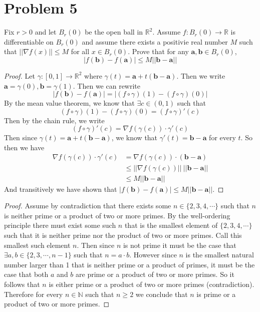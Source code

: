 \documentclass{article}
\theoremstyle{definition}
\begin{document}
\section*{Problem 5}
    \begin{mdframed}
        Fix $r > 0$ and let $B_r(0)$ be the open ball in $\mathbb{R}^2$. Assume $f: B_r(0) \rightarrow \mathbb{R}
        $ is differentiable on $B_r(0)$ and assume there exists a positivie real number $M$ such that $||\nabla f(x)|| \leqslant M$
        for all $x \in B_r(0)$. Prove that for any $\bm a,\bm b \in B_r(0)$,
        \[
            |f(\bm b) - f(\bm a)| \leqslant M||\bm b-\bm a||
        \]
    \end{mdframed}
    \begin{proof}
        Let $\gamma : [0,1] \rightarrow \mathbb{R}^2$ where $\gamma(t) = \bm a + t (\bm b - \bm a)$.
        Then we write $\bm a = \gamma(0), \bm b = \gamma(1)$. Then we can rewrite 
        \[
            |f(\bm b) - f(\bm a)| = |(f\circ \gamma)(1) - (f \circ \gamma)(0)|
        \]
        By the mean value theorem, we know that $\exists c \in (0,1)$ such that 
        \[
            (f\circ \gamma)(1) - (f \circ \gamma)(0) = (f \circ \gamma)'(c)
        \]
        Then by the chain rule, we write
        \[
            (f \circ \gamma)'(c) = \nabla f(\gamma (c)) \cdot \gamma'(c)
        \]
        Then since $\gamma(t) = \bm a + t(\bm b - \bm a)$, we know that $\gamma'(t) = \bm b - \bm a$ for every
        $t$. So then we have 
        \begin{align*}
            \nabla f ( \gamma (c)) \cdot \gamma'(c) &= \nabla f ( \gamma (c)) \cdot (\bm b - \bm a)\\
            &\leqslant ||\nabla f(\gamma(c))|| \ ||\bm b - \bm a|| \\
            &\leqslant M ||\bm b - \bm a||
        \end{align*}
        And transitively we have shown that $|f(\bm b) - f(\bm a)| \leqslant M||\bm b - \bm a||$.
    \end{proof}
\begin{proof}
    Assume by contradiction that there exists some $n \in \{2,3,4,\cdots\}$ such that $n$ is neither prime 
    or a product of two or more primes. By the well-ordering principle there must exist some such $n$
    that is the smallest element of $\{2,3,4,\cdots\}$ such that it is neither prime nor the product of two or more primes.
    Call this smallest such element $n$. Then since $n$ is not prime it must be the case that $\exists a,b \in \{2,3,\cdots,n-1\}$
    such that $n = a \cdot b$. However since $n$ is the smallest natural number larger than 1 that is neither prime or a product of primes,
    it must be the case that both $a$ and $b$ are prime or a product of two or more primes. So it follows that $n$ is either prime or a product of two or more primes (contradiction).
    Therefore for every $n \in \mathbb{N}$ such that $n \geqslant 2$ we conclude that $n$ is prime or a product of two or more primes.
\end{proof}
\end{document}

